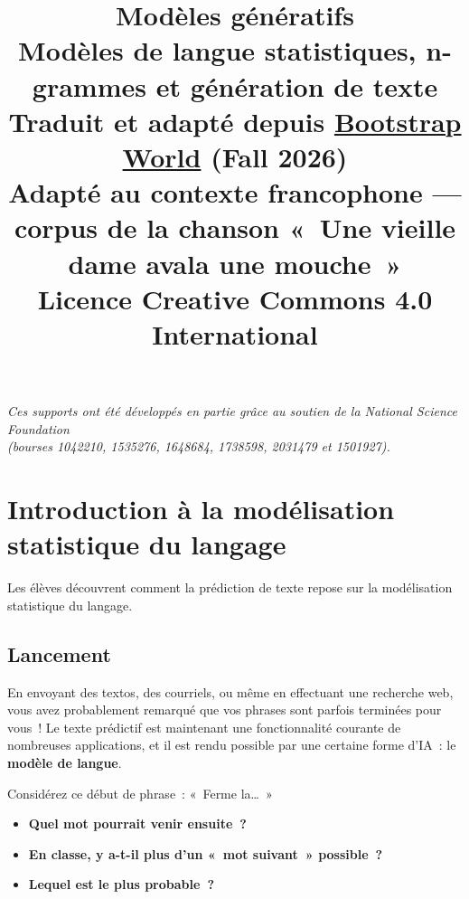 \documentclass[12pt,a4paper]{article}
\title{%
  \vspace{-2cm}
  {\Huge\bfseries Modèles génératifs}\\[0.5em]
  {\large Modèles de langue statistiques, n-grammes et génération de texte}\\[1em]
  {\normalsize Traduit et adapté depuis \href{https://www.bootstrapworld.org/materials/fall2026/en-us/lessons/stat-lang-models-generating-text/}{Bootstrap World} (Fall 2026)}\\
  {\normalsize Adapté au contexte francophone — corpus de la chanson «~Une vieille dame avala une mouche~»}\\[0.5em]
  {\normalsize Licence Creative Commons 4.0 International}
}
\date{}
\author{}
\begin{document}
\maketitle
\thispagestyle{empty}

\vspace{2cm}
\begin{center}
  \textit{Ces supports ont été développés en partie grâce au soutien de la National Science Foundation\\
  (bourses 1042210, 1535276, 1648684, 1738598, 2031479 et 1501927).}
\end{center}

\newpage
\tableofcontents
\newpage

\section{Introduction à la modélisation statistique du langage}

\begin{overviewbox}
  Les élèves découvrent comment la prédiction de texte repose sur la modélisation statistique du langage.
\end{overviewbox}

\subsection{Lancement}

En envoyant des textos, des courriels, ou même en effectuant une recherche web, vous avez probablement remarqué que vos phrases sont parfois terminées pour vous~! Le texte prédictif est maintenant une fonctionnalité courante de nombreuses applications, et il est rendu possible par une certaine forme d'IA~: le \textbf{modèle de langue}.

Considérez ce début de phrase~: «~Ferme la…~»

\begin{thinkbox}
  \begin{itemize}
    \item \textbf{Quel mot pourrait venir ensuite~?}
    \item \textbf{En classe, y a-t-il plus d'un «~mot suivant~» possible~?}
    \item \textbf{Lequel est le plus probable~?}
  \end{itemize}
\end{thinkbox}
\end{document}
